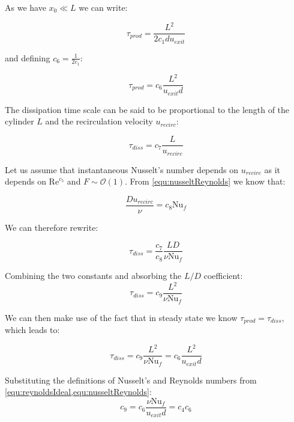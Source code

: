 \noindent As we have $x_0\ll L$ we can write:

\begin{equation}
\tau_{prod} = \frac{L^2}{2c_1du_{exit}}
\end{equation}

\noindent and defining $c_6 = \frac{1}{2c_1}$:

\begin{equation}
\tau_{prod} = c_6 \frac{L^2}{u_{exit} d}
\end{equation}

\noindent The dissipation time scale can be said to be proportional to the length of the cylinder $L$ and the recirculation velocity $u_{recirc}$: 

\begin{equation}
\tau_{diss} = c_7 \frac{L}{u_{recirc}}
\end{equation}

\noindent Let us assume that instantaneous Nusselt's number depends on $u_{recirc}$ as it depends on $\text{Re}^{c_5}$ and $F\sim\mathcal{O}(1)$. From \cref{equ:nusseltReynolds} we know that: 

\begin{equation}
\frac{D u_{recirc}}{\nu} = c_8 \text{Nu}_f
\end{equation}

\noindent We can therefore rewrite:

\begin{equation}
\tau_{diss} = \frac{c_7}{c_8} \frac{LD}{\nu \text{Nu}_f}
\end{equation}

\noindent Combining the two constants and absorbing the $L/D$ coefficient:
\begin{equation}
\tau_{diss} = c_9 \frac{L^2}{\nu \text{Nu}_f}
\end{equation}

\noindent We can then make use of the fact that in steady state we know $\tau_{prod} = \tau_{diss}$, which leads to:

\begin{equation}
\tau_{diss} = c_9 \frac{L^2}{\nu \text{Nu}_f} = c_6 \frac{L^2}{u_{exit} d}
\end{equation}

\noindent  Substituting the definitions of Nusselt's and Reynolds numbers from \cref{equ:reynoldsIdeal,equ:nusseltReynolds}:
\begin{equation}
c_9 = c_6 \frac{\nu\text{Nu}_f}{u_{exit}d} = c_4 c_6
\end{equation}

